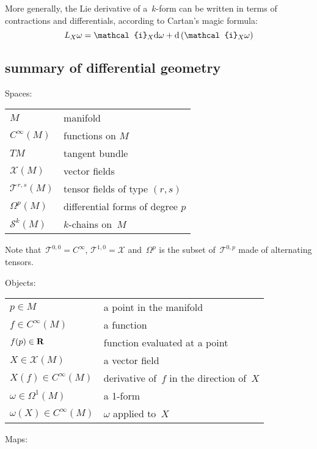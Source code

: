 More generally, the Lie derivative of a~$k$-form can be written in terms of
contractions and differentials, according to Cartan's magic formula:
\[
	L_X\omega=\mathcal{i}_X\ud\omega+\ud\left(\mathcal{i}_X\omega\right)
\]

\clearpage
\subsection{summary of differential geometry}

Spaces:

\begin{tabular}{l|l}
	\hline
	$M$ & manifold \\
	$C^\infty(M)$ & functions on $M$ \\
	$TM$ & tangent bundle \\
	$\mathcal{X}(M)$ & vector fields \\
	$\mathcal{T}^{r,s}(M)$ & tensor fields of type $(r,s)$ \\
	$\Omega^p(M)$ & differential forms of degree $p$\\
	$\mathcal{S}^k(M)$ & $k$-chains on~$M$
\end{tabular}

Note that~$\mathcal{T}^{0,0}=C^\infty$,
$\mathcal{T}^{1,0}=\mathcal{X}$ and~$\Omega^p$ is the subset
of~$\mathcal{T}^{0,p}$ made of alternating tensors.


\bigskip

Objects:

\begin{tabular}{l|l}
	\hline
	$p\in M$ & a point in the manifold \\
	$f\in C^\infty(M)$ &a function \\
	$f(p)\in\mathbf{R}$ & function evaluated at a point \\
	$X\in \mathcal{X}(M)$ & a vector field \\
	$X(f)\in C^\infty(M)$ & derivative of~$f$ in the direction of~$X$ \\
	$\omega\in \Omega^1(M)$ & a 1-form \\
	$\omega(X)\in C^\infty(M)$ & $\omega$ applied to~$X$ \\
\end{tabular}


\bigskip

Maps:

